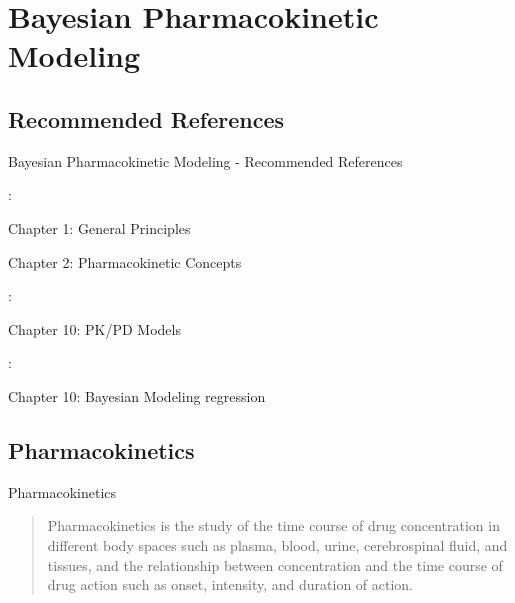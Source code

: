 
\section{Bayesian Pharmacokinetic Modeling}

\subsection{Recommended References}
\begin{frame}{Bayesian Pharmacokinetic Modeling - Recommended References}
    \begin{vfilleditems}
        \item \textcite{Gabrielsson2006PKPDbook}:
        \begin{vfilleditems}
            \item Chapter 1: General Principles
            \item Chapter 2: Pharmacokinetic Concepts
        \end{vfilleditems}
        \item \textcite{Owen2014PKPDbook}:
        \begin{vfilleditems}
            \item Chapter 10: PK/PD Models
        \end{vfilleditems}
        \item \textcite{Bonate2011PKPDbook}:
        \begin{vfilleditems}
            \item Chapter 10: Bayesian Modeling regression
        \end{vfilleditems}
        \item \textcite{margossian2022torsten}
    \end{vfilleditems}
\end{frame}

\subsection{Pharmacokinetics}
\begin{frame}{Pharmacokinetics}
    \begin{defn}[Pharmacokinetics]
        \begin{quotation}
            Pharmacokinetics is the study of the time course of drug concentration in
            different body spaces such as plasma, blood, urine, cerebrospinal fluid, and
            tissues, and the relationship between concentration and the time course of
            drug action such as onset, intensity, and duration of action.
        \end{quotation}
        \vfill \vfill
        \textcite[13]{Gabrielsson2006PKPDbook}
    \end{defn}
\end{frame}

